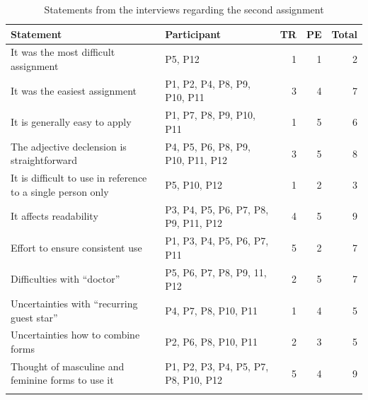 \begin{table}[ht]
    \caption{Statements from the interviews regarding the second assignment}
    \centering
    \begin{tabularx}{\textwidth}{QQrrr}
    \lsptoprule
        \textbf{Statement} & \textbf{Participant} & \textbf{TR} & \textbf{PE} & \textbf{Total} \\
\midrule
       It was the most difficult assignment & P5, P12 & 1 & 1 & 2 \\
       It was the easiest assignment & P1, P2, P4, P8, P9, P10, P11 & 3 & 4 & 7 \\
       It is generally easy to apply & P1, P7, P8, P9, P10, P11 & 1 & 5 & 6 \\
       The adjective declension is straightforward & P4, P5, P6, P8, P9, P10, P11, P12 & 3 & 5 & 8 \\
       It is difficult to use in reference to a single person only & P5, P10, P12 & 1 & 2 & 3 \\
       It affects readability & P3, P4, P5, P6, P7, P8, P9, P11, P12 & 4 & 5 & 9 \\
       Effort to ensure consistent use & P1, P3, P4, P5, P6, P7, P11 & 5 & 2 & 7 \\
       Difficulties with ``doctor'' & P5, P6, P7, P8, P9, 11, P12 & 2 & 5 & 7 \\
       Uncertainties with ``recurring guest star'' & P4, P7, P8, P10, P11 & 1 & 4 & 5 \\
       Uncertainties how to combine forms & P2, P6, P8, P10, P11 & 2 & 3 & 5 \\
       Thought of masculine and feminine forms to use it & P1, P2, P3, P4, P5, P7, P8, P10, P12 & 5 & 4 & 9 \\
\lspbottomrule
    \end{tabularx}
    \label{tab:interviews_GIC}
\end{table}


